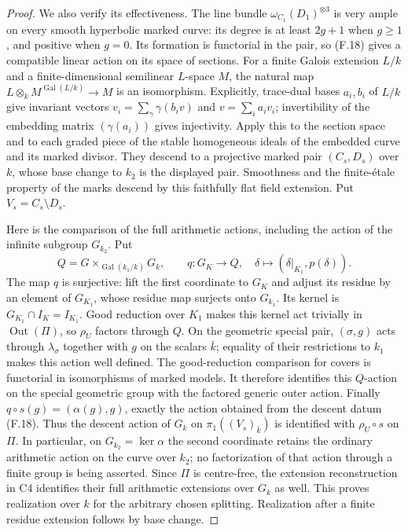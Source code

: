 \begin{proof}
We also verify its effectiveness. The line bundle
$\omega_{C_1}(D_1)^{\otimes3}$ is very ample on every smooth
hyperbolic marked curve: its degree is at least $2g+1$ when
$g\ge1$, and positive when $g=0$. Its formation is functorial
in the pair, so (F.18) gives a compatible linear action on its
space of sections. For a finite Galois extension $L/k$ and a
finite-dimensional semilinear $L$-space $M$, the natural map
$L\otimes_k M^{\operatorname{Gal}(L/k)}\to M$ is an
isomorphism. Explicitly, trace-dual bases $a_i,b_i$ of $L/k$
give invariant vectors $v_i=\sum_\gamma\gamma(b_i v)$ and
$v=\sum_i a_i v_i$; invertibility of the embedding matrix
$(\gamma(a_i))$ gives injectivity. Apply this to the section
space and to each graded piece of the stable homogeneous ideals
of the embedded curve and its marked divisor. They descend to
a projective marked pair $(C_s,D_s)$ over $k$, whose base
change to $k_2$ is the displayed pair. Smoothness and the
finite-\'etale property of the marks descend by this faithfully
flat field extension. Put $V_s=C_s\setminus D_s$.

Here is the comparison of the full arithmetic actions, including
the action of the infinite subgroup $G_{k_2}$. Put
\[
 Q=G\times_{\operatorname{Gal}(k_1/k)}G_k,
 \qquad q:G_K\longrightarrow Q,
 \quad \delta\longmapsto(\delta|_{K_1},p(\delta)).
\]
The map $q$ is surjective: lift the first coordinate to $G_K$
and adjust its residue by an element of $G_{K_1}$, whose residue
map surjects onto $G_{k_1}$. Its kernel is
$G_{K_1}\cap I_K=I_{K_1}$. Good reduction over $K_1$ makes this
kernel act trivially in $\operatorname{Out}(\Pi)$, so $\rho_U$
factors through $Q$. On the geometric special pair, $(\sigma,g)$
acts through $\lambda_\sigma$ together with $g$ on the scalars
$\bar k$; equality of their restrictions to $k_1$ makes this
action well defined. The good-reduction comparison for covers
is functorial in isomorphisms of marked models. It therefore
identifies this $Q$-action on the special geometric group with
the factored generic outer action. Finally
$q\circ s(g)=(\alpha(g),g)$, exactly the action obtained from
the descent datum (F.18). Thus the descent action of $G_k$ on
$\pi_1((V_s)_{\bar k})$ is identified with $\rho_U\circ s$ on
$\Pi$. In particular, on $G_{k_2}=\ker\alpha$ the second
coordinate retains the ordinary arithmetic action on the curve
over $k_2$; no factorization of that action through a finite
group is being asserted.
Since $\Pi$ is centre-free, the extension reconstruction in C4
identifies their full arithmetic extensions over $G_k$ as well.
This proves realization over $k$ for the arbitrary chosen
splitting. Realization after a finite residue extension follows
by base change.


\end{proof}
